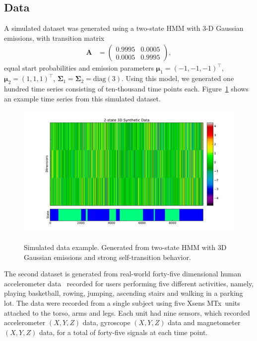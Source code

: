 \documentclass[letterpaper]{article}
\begin{document}
\subsection{Data}\label{sec:datasets}

A simulated dataset was generated using a two-state HMM with 3-D Gaussian emissions, with transition matrix
\begin{align*}
    \mathbf{A} &= \left( 
                   \begin{array}{ccc}
                    0.9995 & 0.0005 \\
                    0.0005 & 0.9995
                   \end{array}
                   \right),
\end{align*}
equal start probabilities and emission parameters $\mathbf{\mu}_1 = (-1, -1, -1)^\top$, $\mathbf{\mu}_2 = (1, 1, 1)^\top$, $\mathbf{\Sigma}_1 = \mathbf{\Sigma}_2 = \text{diag}(3)$. Using this model, we generated one hundred time series consisting of ten-thousand time points each. Figure~\ref{fig:simulated} shows an example time series from this simulated dataset.

\begin{figure}[htbp]
  \caption{Simulated data example. Generated from two-state HMM with 3D Gaussian emissions and strong self-transition behavior.}
  \centering
    \includegraphics[width=1.\linewidth]{images/3D_synthetic_data_example.pdf}
    \label{fig:simulated}
\end{figure}
The second dataset is generated from real-world forty-five dimensional human accelerometer data~\cite{Altun:2010:CSC:1823245.1823314} recorded for users performing five different activities, namely, playing basketball, rowing, jumping, ascending stairs and walking in a parking lot. The data were recorded from a single subject using five Xsens MTx\texttrademark\ units attached to the torso, arms and legs. Each unit had nine sensors, which recorded accelerometer $(X, Y, Z)$ data, gyroscope $(X,Y,Z)$ data and magnetometer $(X,Y,Z)$ data, for a total of forty-five signals at each time point.
\end{document}
